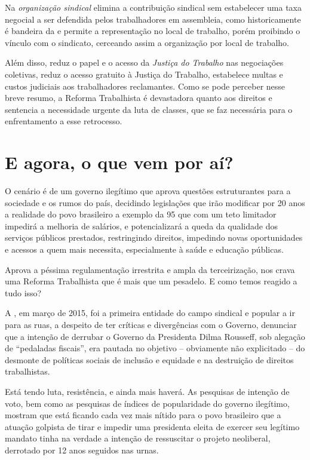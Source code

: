 Na \emph{organização sindical} elimina a contribuição sindical sem
estabelecer uma taxa negocial a ser defendida pelos trabalhadores em
assembleia, como historicamente é bandeira da  e permite a
representação no local de trabalho, porém proibindo o vínculo com o
sindicato, cerceando assim a organização por local de trabalho.

Além disso, reduz o papel e o acesso da \emph{Justiça do Trabalho} nas
negociações coletivas, reduz o acesso gratuito à Justiça do Trabalho,
estabelece multas e custos judiciais aos trabalhadores reclamantes. Como
se pode perceber nesse breve resumo, a Reforma Trabalhista é devastadora
quanto aos direitos e sentencia a necessidade urgente da luta de
classes, que se faz necessária para o enfrentamento a esse retrocesso.

\section{E agora, o que vem por aí?}

O cenário é de um governo ilegítimo que aprova questões estruturantes
para a sociedade e os rumos do país, decidindo legislações que irão
modificar por 20 anos a realidade do povo brasileiro a exemplo da  95
que com um teto limitador impedirá a melhoria de salários, e
potencializará a queda da qualidade dos serviços públicos prestados,
restringindo direitos, impedindo novas oportunidades e acessos a quem
mais necessita, especialmente à saúde e educação públicas.

Aprova a péssima regulamentação irrestrita e ampla da terceirização, nos
crava uma Reforma Trabalhista que é mais que um pesadelo. E como temos
reagido a tudo isso?

A , em março de 2015, foi a primeira entidade do campo sindical e
popular a ir para as ruas, a despeito de ter críticas e divergências com
o Governo, denunciar que a intenção de derrubar o Governo da Presidenta
Dilma Rousseff, sob alegação de ``pedaladas fiscais'', era pautada no
objetivo -- obviamente não explicitado -- do desmonte de políticas
sociais de inclusão e equidade e na destruição de direitos trabalhistas.

Está tendo luta, resistência, e ainda mais haverá. As pesquisas de
intenção de voto, bem como as pesquisas de índices de popularidade do
governo ilegítimo, mostram que está ficando cada vez mais nítido para o
povo brasileiro que a atuação golpista de tirar e impedir uma presidenta
eleita de exercer seu legítimo mandato tinha na verdade a intenção de
ressuscitar o projeto neoliberal, derrotado por 12 anos seguidos nas
urnas.

